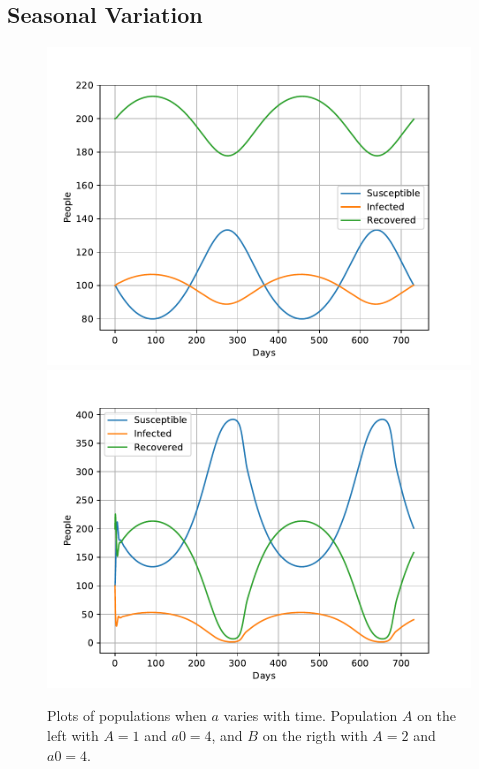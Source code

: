 \documentclass[a4paper]{article}
\let\Oldsubsection\subsection
\renewcommand{\subsection}{\FloatBarrier\Oldsubsection}
\begin{document}
\subsection{Seasonal Variation}

\begin{figure}[!htb]
	\centering 
	\includegraphics[scale=0.56]{../plots/opp_d_A.pdf}
	\includegraphics[scale=0.56]{../plots/opp_d_C.pdf}
	\caption{Plots of populations when $a$ varies with time. Population $A$ on the left with $A=1$ and $a0=4$, and $B$ on the rigth with $A=2$ and $a0=4$.}
	\label{opp_d0}
\end{figure}
\end{document}
